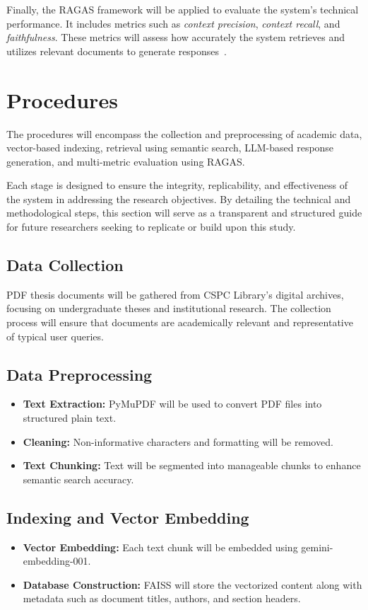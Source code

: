 \begin{refsection}
Finally, the RAGAS framework will be applied to evaluate the system's technical performance. It includes metrics such as \textit{context precision}, \textit{context recall}, and \textit{faithfulness}. These metrics will assess how accurately the system retrieves and utilizes relevant documents to generate responses~\cite{holmes2023chatbot, ameli2024ranking, lin2024satisfaction}.

\section{Procedures}

The procedures will encompass the collection and preprocessing of academic data, vector-based indexing, retrieval using semantic search, LLM-based response generation, and multi-metric evaluation using RAGAS.

Each stage is designed to ensure the integrity, replicability, and effectiveness of the system in addressing the research objectives. By detailing the technical and methodological steps, this section will serve as a transparent and structured guide for future researchers seeking to replicate or build upon this study.

\subsection*{Data Collection}
PDF thesis documents will be gathered from CSPC Library’s digital archives, focusing on undergraduate theses and institutional research. The collection process will ensure that documents are academically relevant and representative of typical user queries.

\subsection*{Data Preprocessing}
\begin{itemize}
    \item \textbf{Text Extraction:} PyMuPDF will be used to convert PDF files into structured plain text.
    \item \textbf{Cleaning:} Non-informative characters and formatting will be removed.
    \item \textbf{Text Chunking:} Text will be segmented into manageable chunks to enhance semantic search accuracy.
\end{itemize}

\subsection*{Indexing and Vector Embedding}
\begin{itemize}
    \item \textbf{Vector Embedding:} Each text chunk will be embedded using gemini-embedding-001.
    \item \textbf{Database Construction:} FAISS will store the vectorized content along with metadata such as document titles, authors, and section headers.
\end{itemize}


\end{refsection}
